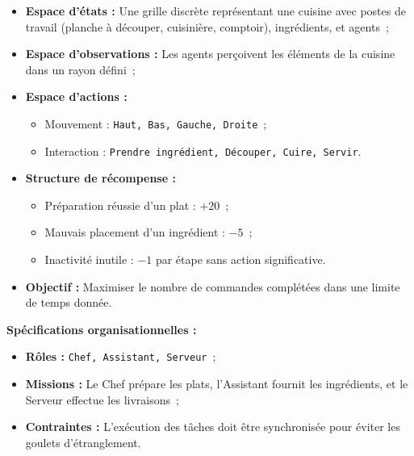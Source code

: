 \begin{itemize}
    \item \textbf{Espace d'états :} Une grille discrète représentant une cuisine avec postes de travail (planche à découper, cuisinière, comptoir), ingrédients, et agents~;
    \item \textbf{Espace d'observations :} Les agents perçoivent les éléments de la cuisine dans un rayon défini~;
    \item \textbf{Espace d'actions :}
          \begin{itemize}
              \item Mouvement : \texttt{Haut, Bas, Gauche, Droite}~;
              \item Interaction : \texttt{Prendre ingrédient, Découper, Cuire, Servir}.
          \end{itemize}
    \item \textbf{Structure de récompense :}
          \begin{itemize}
              \item Préparation réussie d'un plat : $+20$~;
              \item Mauvais placement d'un ingrédient : $-5$~;
              \item Inactivité inutile : $-1$ par étape sans action significative.
          \end{itemize}
    \item \textbf{Objectif :} Maximiser le nombre de commandes complétées dans une limite de temps donnée.
\end{itemize}

\textbf{Spécifications organisationnelles :}
\begin{itemize}
    \item \textbf{Rôles :} \texttt{Chef, Assistant, Serveur}~;
    \item \textbf{Missions :} Le Chef prépare les plats, l'Assistant fournit les ingrédients, et le Serveur effectue les livraisons~;
    \item \textbf{Contraintes :} L'exécution des tâches doit être synchronisée pour éviter les goulets d'étranglement.
\end{itemize}

